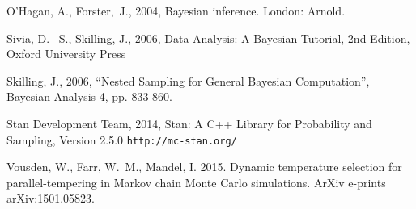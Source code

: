 \begin{thebibliography}{999}
O'Hagan, A., Forster,~J., 2004, Bayesian inference. London: Arnold.

 Sivia, 
D.~ S., Skilling, J., 2006, Data Analysis: A Bayesian Tutorial, 2nd 
Edition, Oxford University Press

 Skilling, 
J., 2006, ``Nested Sampling for General Bayesian Computation'', Bayesian 
Analysis 4, pp. 833-860.

 Stan Development Team, 2014,
Stan: A C++ Library for Probability and Sampling, Version 2.5.0
{\tt http://mc-stan.org/}

 Vousden, W., Farr, 
W.~M., Mandel, I. 2015. Dynamic temperature selection for 
parallel-tempering in Markov chain Monte Carlo simulations. ArXiv e-prints 
arXiv:1501.05823. 

\end{thebibliography}



%

